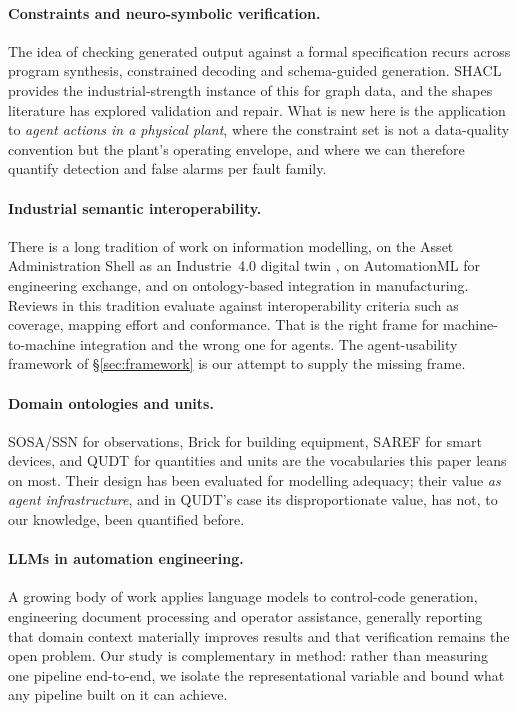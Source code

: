 \paragraph{Constraints and neuro-symbolic verification.} The idea of checking
generated output against a formal specification recurs across program synthesis,
constrained decoding and schema-guided generation. SHACL
\cite{knublauch2017shacl} provides the industrial-strength instance of this for
graph data, and the shapes literature has explored validation and repair. What
is new here is the application to \emph{agent actions in a physical plant}, where
the constraint set is not a data-quality convention but the plant's operating
envelope, and where we can therefore quantify detection and false alarms per
fault family.

\paragraph{Industrial semantic interoperability.} There is a long tradition of
work on \opcua{} information modelling, on the Asset Administration Shell as an
Industrie~4.0 digital twin \cite{idta2023aas}, on AutomationML for engineering
exchange, and on ontology-based integration in manufacturing. Reviews in this
tradition evaluate against interoperability criteria such as coverage, mapping
effort and conformance. That is the right frame for machine-to-machine
integration and the wrong one for agents. The agent-usability framework of
\S\ref{sec:framework} is our attempt to supply the missing frame.

\paragraph{Domain ontologies and units.} SOSA/SSN \cite{haller2019ssn} for
observations, Brick \cite{balaji2016brick} for building equipment, SAREF for
smart devices, and QUDT \cite{qudt} for quantities and units are the vocabularies
this paper leans on most. Their design has been evaluated for modelling adequacy;
their value \emph{as agent infrastructure}, and in QUDT's case its
disproportionate value, has not, to our knowledge, been quantified before.

\paragraph{LLMs in automation engineering.} A growing body of work applies
language models to control-code generation, engineering document processing and
operator assistance, generally reporting that domain context materially improves
results and that verification remains the open problem. Our study is
complementary in method: rather than measuring one pipeline end-to-end, we
isolate the representational variable and bound what any pipeline built on it can
achieve.


